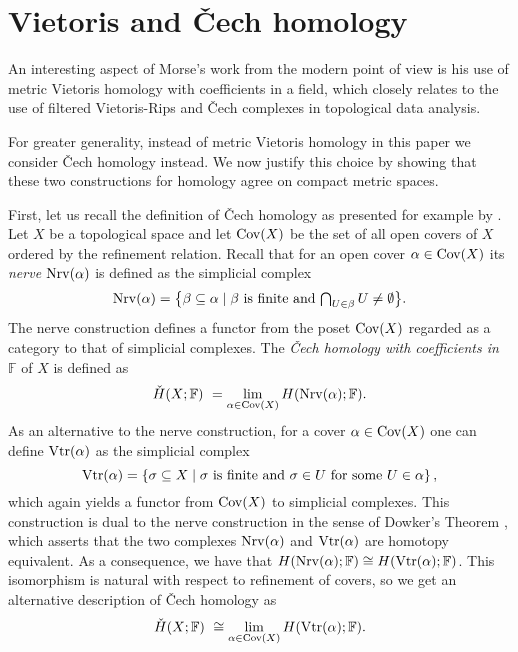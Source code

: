 
\section{Vietoris and \texorpdfstring{\v{C}}{}ech homology} \label{s:vietoris}  %

An interesting aspect of Morse's work from the modern point of view is his use of metric Vietoris homology with coefficients in a field, which closely relates to the use of filtered Vietoris-Rips and \v{C}ech complexes in topological data analysis.

For greater generality, instead of metric Vietoris homology in this paper we consider \v{C}ech homology instead.
We now justify this choice by showing that these two constructions for homology agree on compact metric spaces.

First, let us recall the definition of \v{C}ech homology as presented for example by \citet[Section IX--X]{Eilenberg.1952}.
Let $X$ be a topological space and let $\operatorname{Cov}(X)$ be the set of all open covers of $X$ ordered by the refinement relation. 
Recall that for an open cover $\alpha \in \operatorname{Cov}(X)$ its \emph{nerve} $\operatorname{Nrv}(\alpha)$ is defined as the simplicial complex
\begin{equation*}
\operatorname{Nrv}(\alpha) =
\big\{ \beta \subseteq \alpha \mid \beta \text{ is finite and } \textstyle{\bigcap_{U \in \beta}} \, U \neq \emptyset \big\}.
\end{equation*}
The nerve construction defines a functor from the poset $\operatorname{Cov}(X)$ regarded as a category to that of simplicial complexes. 
The \emph{\v{C}ech homology with coefficients in $\mathbb{F}$} of $X$ is defined as
\begin{equation*}
\check{H}(X; \mathbb{F}) \ =
\lim_{\alpha \in \operatorname{Cov}(X)} H(\operatorname{Nrv}(\alpha); \mathbb{F}).
\end{equation*}
As an alternative to the nerve construction, for a cover $\alpha \in \operatorname{Cov}(X)$ one can define $\operatorname{Vtr}(\alpha)$ as the simplicial complex
\begin{equation*}
\operatorname{Vtr} (\alpha) = \left\{ \sigma \subseteq X \mid \sigma \text{ is finite and } \sigma \in U \text{ for some } U \in \alpha \right\},
\end{equation*}
which again yields a functor from $\operatorname{Cov}(X)$ to simplicial complexes.
This construction is dual to the nerve construction in the sense of Dowker's Theorem \cite{Dowker.1952}, which asserts that the two complexes $\operatorname{Nrv} (\alpha)$ and $\operatorname{Vtr} (\alpha)$ are homotopy equivalent.
As a consequence, we have that $H (\operatorname{Nrv} (\alpha); \mathbb{F}) \cong H (\operatorname{Vtr} (\alpha); \mathbb{F})$.
This isomorphism is natural with respect to refinement of covers, so we get an alternative description of \v{C}ech homology as 
\begin{equation*}
\check{H} (X; \mathbb{F}) \ \cong
\lim_{\alpha \in \operatorname{Cov} (X)} H (\operatorname{Vtr} (\alpha); \mathbb{F}).
\end{equation*}

